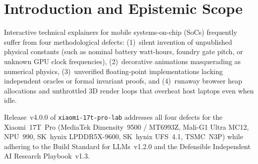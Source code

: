 \documentclass[11pt,a4paper]{amsart}
\newcommand{\code}[1]{{\small\nolinkurl{#1}}}
\theoremstyle{remark}
\begin{document}
\maketitle

\section{Introduction and Epistemic Scope}

Interactive technical explainers for mobile systems-on-chip (SoCs) frequently
suffer from four methodological defects: (1)~silent invention of unpublished
physical constants (such as nominal battery watt-hours, foundry gate pitch, or
unknown GPU clock frequencies), (2)~decorative animations masquerading as
numerical physics, (3)~unverified floating-point implementations lacking
independent oracles or formal invariant proofs, and (4)~runaway browser
heap allocations and unthrottled 3D render loops that overheat host laptops
even when idle.

Release~v4.0.0 of \code{xiaomi-17t-pro-lab} addresses all four defects for
the Xiaomi~17T~Pro (MediaTek Dimensity~9500 / MT6993Z, Mali-G1 Ultra MC12,
NPU~990, SK~hynix LPDDR5X-9600, SK~hynix UFS~4.1, TSMC~N3P) while adhering to
the Build Standard for LLMs~v1.2.0 and the Defensible Independent AI Research
Playbook~v1.3.
\end{document}
